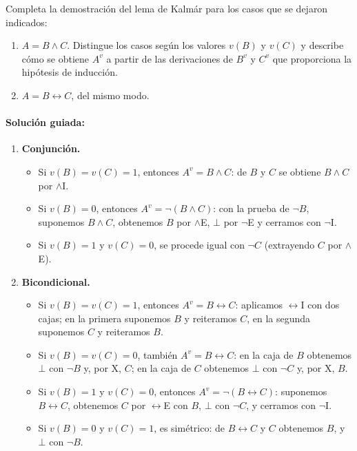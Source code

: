 \begin{pregunta}\label{e3-6}
Completa la demostración del lema de Kalmár para los casos que se dejaron indicados:
\begin{enumerate}
    \item $A = B \land C$. Distingue los casos según los valores $v(B)$ y $v(C)$ y describe cómo se obtiene $A^v$ a partir de las derivaciones de $B^v$ y $C^v$ que proporciona la hipótesis de inducción.
    \item $A = B \leftrightarrow C$, del mismo modo.
\end{enumerate}

\paragraph{Solución guiada:}
\begin{enumerate}
    \item \textbf{Conjunción.}
    \begin{itemize}
        \item Si $v(B) = v(C) = 1$, entonces $A^v = B \land C$: de $B$ y $C$ se obtiene $B \land C$ por $\land$I.
        \item Si $v(B) = 0$, entonces $A^v = \neg(B \land C)$: con la prueba de $\neg B$, suponemos $B \land C$, obtenemos $B$ por $\land$E, $\bot$ por $\neg$E y cerramos con $\neg$I.
        \item Si $v(B) = 1$ y $v(C) = 0$, se procede igual con $\neg C$ (extrayendo $C$ por $\land$E).
    \end{itemize}
    \item \textbf{Bicondicional.}
    \begin{itemize}
        \item Si $v(B) = v(C) = 1$, entonces $A^v = B \leftrightarrow C$: aplicamos $\leftrightarrow$I con dos cajas; en la primera suponemos $B$ y reiteramos $C$, en la segunda suponemos $C$ y reiteramos $B$.
        \item Si $v(B) = v(C) = 0$, también $A^v = B \leftrightarrow C$: en la caja de $B$ obtenemos $\bot$ con $\neg B$ y, por X, $C$; en la caja de $C$ obtenemos $\bot$ con $\neg C$ y, por X, $B$.
        \item Si $v(B) = 1$ y $v(C) = 0$, entonces $A^v = \neg(B \leftrightarrow C)$: suponemos $B \leftrightarrow C$, obtenemos $C$ por $\leftrightarrow$E con $B$, $\bot$ con $\neg C$, y cerramos con $\neg$I.
        \item Si $v(B) = 0$ y $v(C) = 1$, es simétrico: de $B \leftrightarrow C$ y $C$ obtenemos $B$, y $\bot$ con $\neg B$.
    \end{itemize}
\end{enumerate}
\end{pregunta}

